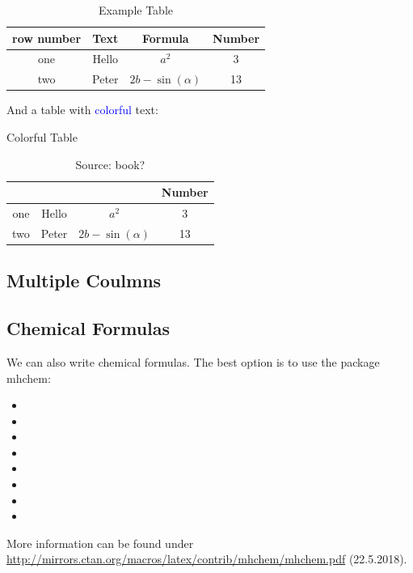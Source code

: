 \documentclass[12pt,a4paper]{article} %
\begin{document}
\begin{table}[h]
\begin{center}
\caption{Example Table}
\begin{tabular}{|c|c|c|c|}
\hline
    row number & Text & Formula & Number \\ \hline
    one & Hello & $a^2$ & 3  \\
    two & Peter & $2b-\sin(\alpha)$ & 13\\
    \hline
\end{tabular}
\end{center}
\end{table}

And a table with  \textcolor{blue}{colorful} text: 
\begin{table}[h]
\begin{center}
\caption{Colorful Table}
\begin{tabular}{|c|c|c|c|}
\hline
\color{red}{row number} &  \color{blue}{Text} & \color{green}{Formula} & Number \\ \hline
    one & Hello & $a^2$ & 3  \\
    two & Peter & $2b-\sin(\alpha)$ & 13\\
    \hline
\end{tabular}
\caption{Source: book?}
	\label{table:farbig}
\end{center}
\end{table}



\subsection{Multiple Coulmns}

\begin{multicols}{2}
\blindtext
\end{multicols}




\subsection{Chemical Formulas}
We can also write chemical formulas. The best option is to use the package mhchem:
\begin{itemize}
	\item {}
	\item {}
	\item {}
	\item {}
	\item  {}
	\item {}
	\item {}
	\item {}
\end{itemize}
More information can be found under \url{http://mirrors.ctan.org/macros/latex/contrib/mhchem/mhchem.pdf} (22.5.2018).
\end{document}

